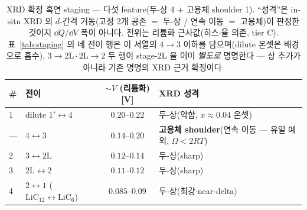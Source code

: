 \begin{table}[t]
\centering\footnotesize
\renewcommand{\arraystretch}{1.3}
\caption{XRD 확정 흑연 staging --- 다섯 feature(두-상 4 $+$ 고용체 shoulder 1). ``성격''은 in-situ XRD 의
$d$-간격 거동(고정 2개 공존 $=$ 두-상 / 연속 이동 $=$ 고용체)이 판정한 것이지 $\dd Q/\dd V$ 폭이 아니다\cite{dahn1991,ohzuku1993}.
전위는 리튬화 근사값(히스$\cdot$율 의존, tier C). 표~\ref{tab:staging} 의 네 전이 행은 이 서열의 $4\!\to\!3$
이하를 담으며(dilute 온셋은 배경으로 흡수), $3\!\to\!2\mathrm L\cdot2\mathrm L\!\to\!2$ 두 행이 stage-2L 을 이미
\emph{별도로} 명명한다 --- 상 추가가 아니라 기존 명명의 XRD 근거 확정이다.}
\label{tab:staging-xrd}
\begin{tabular}{@{}l l c l@{}}
\toprule
\# & 전이 & $\sim V$ (리튬화) [V] & XRD 성격 \\
\midrule
1 & dilute $1'\!\leftrightarrow\!4$        & $0.20$--$0.22$ & 두-상(약함, $x\!\approx\!0.04$ 온셋) \\
--- & $4\!\leftrightarrow\!3$               & $0.14$--$0.20$ & \textbf{고용체 shoulder}(연속 이동 --- 유일 예외, $\Omega\!<\!2RT$) \\
2 & $3\!\leftrightarrow\!2\mathrm L$        & $0.12$--$0.14$ & 두-상(sharp) \\
3 & $2\mathrm L\!\leftrightarrow\!2$        & $0.11$--$0.12$ & 두-상(sharp) \\
4 & $2\!\leftrightarrow\!1$ ($\mathrm{LiC_{12}}\!\leftrightarrow\!\mathrm{LiC_6}$) & $0.085$--$0.09$ & 두-상(최강$\cdot$near-delta) \\
\bottomrule
\end{tabular}
\end{table}

